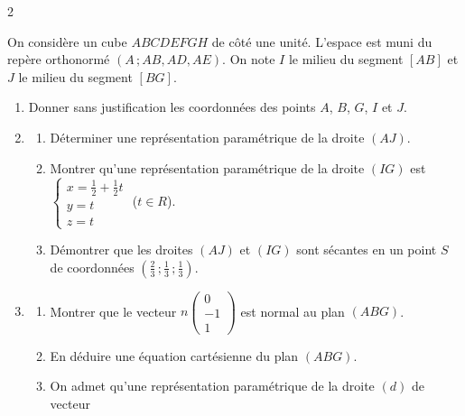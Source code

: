 \documentclass[a4paper,10pt]{article}
\newcommand{\R}{\mathbb{R}}
\newcommand{\N}{\mathbb{N}}
\newcommand{\Z}{\mathbb{Z}}
\newcommand{\Q}{\mathbb{Q}}
\newcommand{\vect}[1]{\overrightarrow{#1}}
\newcommand{\fois}[1]{\times{\color{coulExo}#1}}
\providecommand{\Cf}{\mathcal{C}\sb{f}}%
\providecommand{\Cg}{\mathcal{C}\sb{g}}%
\def\R{R}\def\N{N}\def\Z{Z}\def\Q{Q}\def\vect#1{#1}\def\Cf{Cf}\def\Cg{Cg}\def\fois#1{×#1}%
\newcommand{\cubeespace}[1]{%
  \coordinate (A) at (0,0); \coordinate (B) at (#1,0);
  \coordinate (D) at ({0.45*#1},{0.35*#1}); \coordinate (C) at ({#1+0.45*#1},{0.35*#1});
  \coordinate (E) at (0,#1); \coordinate (F) at (#1,#1);
  \coordinate (H) at ({0.45*#1},{#1+0.35*#1}); \coordinate (G) at ({#1+0.45*#1},{#1+0.35*#1});
  \draw (A)--(B)--(F)--(E)--cycle (B)--(C)--(G)--(F) (E)--(H)--(G);
  \draw[dashed] (A)--(D)--(C) (D)--(H);
  \path[font=\footnotesize] (A) node[below left]{$A$} (B) node[below right]{$B$}
    (C) node[right]{$C$} (D) node[above left]{$D$} (E) node[left]{$E$}
    (F) node[below right]{$F$} (G) node[above right]{$G$} (H) node[above left]{$H$};}
\begin{document}
\begin{multicols}{2}
\begin{minipage}[t]{0.56\linewidth}\raggedright
On considère un cube $ABCDEFGH$ de côté une unité. L'espace est muni du repère
orthonormé $(A\,;\vect{AB},\vect{AD},\vect{AE})$. On note $I$ le milieu du segment
$[AB]$ et $J$ le milieu du segment $[BG]$.
\end{minipage}\hfill
\begin{minipage}[t]{0.42\linewidth}\centering\vspace{0pt}
\end{minipage}
\begin{enumerate}
  \item Donner sans justification les coordonnées des points $A$, $B$, $G$, $I$ et $J$.
  \item
  \begin{enumerate}[label=\alph*)]
    \item Déterminer une représentation paramétrique de la droite $(AJ)$.
    \item Montrer qu'une représentation paramétrique de la droite $(IG)$ est
          $\left\{\begin{array}{l} x=\frac{1}{2}+\frac{1}{2}t\\ y=t\\ z=t\end{array}\right.$
          ($t\in\R$).
    \item Démontrer que les droites $(AJ)$ et $(IG)$ sont sécantes en un point $S$ de
          coordonnées $\left(\frac{2}{3}\,;\frac{1}{3}\,;\frac{1}{3}\right)$.
  \end{enumerate}
  \item
  \begin{enumerate}[label=\alph*)]
    \item Montrer que le vecteur $\vect{n}\begin{pmatrix}0\\-1\\1\end{pmatrix}$ est
          normal au plan $(ABG)$.
    \item En déduire une équation cartésienne du plan $(ABG)$.
    \item On admet qu'une représentation paramétrique de la droite $(d)$ de vecteur

\end{enumerate}
\end{enumerate}
\end{multicols}
\end{document}
